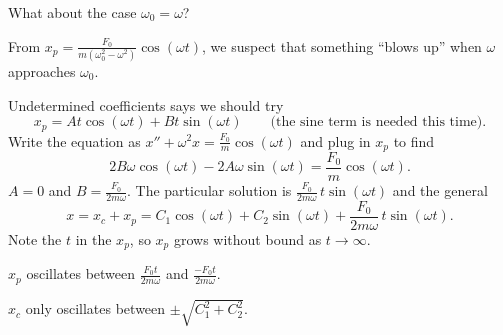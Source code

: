 \documentclass[10pt,aspectratio=169]{beamer}
\begin{document}
\begin{frame}
What about the case $\omega_0 = \omega$?

\medskip
\pause

From $x_p = \frac{F_0}{m(\omega_0^2 - \omega^2)} \cos (\omega t)$, we suspect
that something ``blows up'' when $\omega$ approaches $\omega_0$.

\medskip
\pause

Undetermined coefficients says we should try
\[
x_p = A t \cos (\omega t) + B t \sin (\omega t)
\qquad \text{(the sine term is needed this time)}.
\]
\pause
Write the equation as
\qquad $x'' + \omega^2 x = \frac{F_0}{m} \cos ( \omega t)$
\qquad and plug in $x_p$ to find
\[
2 B \omega \cos (\omega t) - 2 A \omega \sin (\omega t) = 
\frac{F_0}{m} \cos (\omega t) .
\]
\pause
$A = 0$ and $B = \frac{F_0}{2m\omega}$. \pause  The particular solution is
$\frac{F_0}{2m\omega} \, t \sin (\omega t)$ and the general
\[
x = x_c + x_p = C_1 \cos (\omega t) + C_2 \sin (\omega t)
+ \frac{F_0}{2m\omega} \, t \sin (\omega t) .
\]
\pause
Note the $t$ in the $x_p$, so $x_p$ grows without bound as $t \to \infty$.

\pause
$x_p$ oscillates between $\frac{F_0 t}{2m\omega}$ and
$\frac{- F_0 t}{2m\omega}$.

$x_c$ only oscillates between
$\pm\sqrt{C_1^2 + C_2^2}$.

\end{frame}
\end{document}

